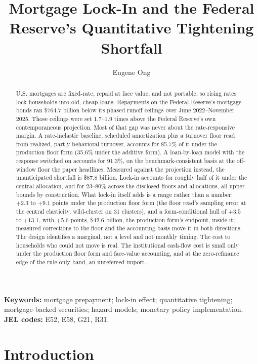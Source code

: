 \documentclass[12pt]{article}
\title{Mortgage Lock-In and the Federal Reserve's Quantitative Tightening Shortfall}
\author{Eugene Ong}
\affil{Carnegie Mellon University}
\date{}
\begin{document}
\maketitle
\begin{abstract}
\noindent U.S. mortgages are fixed-rate, repaid at face value, and not portable, so rising rates lock households into old, cheap loans. Repayments on the Federal Reserve's mortgage bonds ran \$764.7 billion below its phased runoff ceilings over June 2022--November 2025. Those ceilings were set 1.7--1.9 times above the Federal Reserve's own contemporaneous projection. Most of that gap was never about the rate-responsive margin. A rate-inelastic baseline, scheduled amortization plus a turnover floor read from realized, partly behavioral turnover, accounts for 85.7\% of it under the production floor form (35.6\% under the additive form). A loan-by-loan model with the response switched on accounts for 91.3\%, on the benchmark-consistent basis at the off-window floor the paper headlines. Measured against the projection instead, the unanticipated shortfall is \$87.8 billion. Lock-in accounts for roughly half of it under the central allocation, and for 23--80\% across the disclosed floors and allocations, all upper bounds by construction. What lock-in itself adds is a range rather than a number: $+2.3$ to $+9.1$ points under the production floor form (the floor read's sampling error at the central elasticity, wild-cluster on 31 clusters), and a form-conditional hull of $+3.5$ to $+13.1$, with $+5.6$ points, \$42.6 billion, the production form's endpoint, inside it; measured corrections to the floor and the accounting basis move it in both directions. The design identifies a marginal, not a level and not monthly timing. The cost to households who could not move is real. The institutional cash-flow cost is small only under the production floor form and face-value accounting, and at the zero-refinance edge of the rule-only band, an unrefereed import.
\end{abstract}

\vspace{0.5\baselineskip}
{\footnotesize\noindent\textbf{Keywords:} mortgage prepayment; lock-in effect; quantitative tightening; mortgage-backed securities; hazard models; monetary policy implementation.\\
\textbf{JEL codes:} E52, E58, G21, R31.\par}
\newpage
\section{Introduction}\label{sec:intro}
\end{document}
